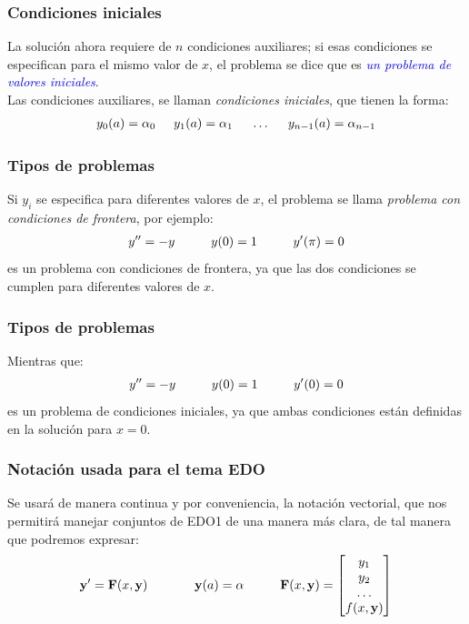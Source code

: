 \documentclass[12pt]{beamer}
\begin{document}
\begin{frame}
\frametitle{Condiciones iniciales}
La solución ahora requiere de $n$ condiciones auxiliares; si esas condiciones se especifican para el mismo valor de $x$, el problema se dice que es \emph{\textcolor{blue}{un problema de valores iniciales}}.
\\
\medskip
\pause
Las condiciones auxiliares, se llaman \emph{\textcolor{lava!90!black}{condiciones iniciales}}, que tienen la forma:
\pause
\begin{align*}
y_{0} (a) = \alpha_{0} \hspace{0.5cm} y_{1} (a) = \alpha_{1} \hspace{0.5cm} \ldots \hspace{0.5cm} y_{n-1} (a) = \alpha_{n-1}
\end{align*}
\end{frame}
\begin{frame}
\frametitle{Tipos de problemas}
Si $y_{i}$ se especifica para diferentes valores de $x$, el problema se llama \emph{problema con condiciones de frontera}, por ejemplo:
\pause
\begin{align*}
{y}^{\prime \prime} = - y \hspace{1cm} y (0) = 1 \hspace{1cm} {y}^{\prime} (\pi) = 0
\end{align*}
es un \textcolor{awesome}{problema con condiciones de frontera}, ya que las dos condiciones se cumplen para diferentes valores de $x$.
\end{frame}
\begin{frame}
\frametitle{Tipos de problemas}
Mientras que:
\pause
\begin{align*}
{y}^{\prime \prime} = -y \hspace{1cm} y (0) = 1 \hspace{1cm} {y}^{\prime} (0) = 0
\end{align*}
es un \textcolor{bole}{problema de condiciones iniciales}, ya que ambas condiciones están definidas en la solución para $x = 0$.
\end{frame}
\begin{frame}
\frametitle{Notación usada para el tema EDO}
Se usará de manera continua y por conveniencia, la notación vectorial, que nos permitirá manejar conjuntos de EDO1 de una manera más clara, de tal manera que podremos expresar:
\pause
\renewcommand*{\arraystretch}{0.7}
\begin{eqnarray*}
\begin{aligned}
\mathbf{{y}^{\prime}} = \mathbf{F} (x, \mathbf{y}) \hspace{1.3cm} \mathbf{y} (a) = \alpha \hspace{1cm}
\mathbf{F} (x, \mathbf{y}) = \left[ \begin{matrix}
y_{1} \\
y_{2} \\
\ldots \\
f (x, \mathbf{y})
\end{matrix} \right]
\end{aligned}
\end{eqnarray*}
\end{frame}
\end{document}
